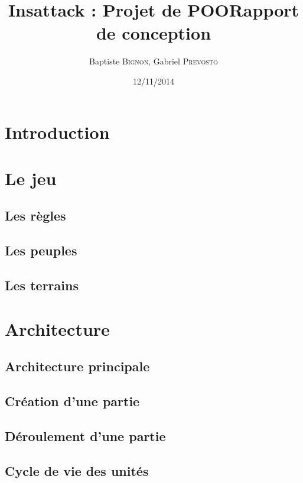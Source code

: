 \documentclass[12pt]{article}
\title{Insattack : Projet de POO\smallbreak Rapport de conception}
\author{Baptiste \textsc{Bignon}, Gabriel \textsc{Prevosto}}
\date{12/11/2014}
\begin{document}
\maketitle
\newpage

\tableofcontents
\renewcommand{\contentsname}{Sommaire}
\newpage


\section{Introduction}			\label{sec:introduction}
\newpage

\section{Le jeu}				\label{sec:jeu}
\subsection{Les règles}			\label{sec:regles}
\subsection{Les peuples}			\label{peuples}
\subsection{Les terrains}			\label{terrains}
\newpage

\section{Architecture}			\label{sec:archi}
\subsection{Architecture principale}	\label{sec:architecturePrincipale}
\subsection{Création d'une partie}	\label{sec:creationPartie}
\subsection{Déroulement d'une partie}	\label{sec:deroulementPartie}
\subsection{Cycle de vie des unités}	\label{sec:cycleVieUnites}
\newpage
\end{document}
